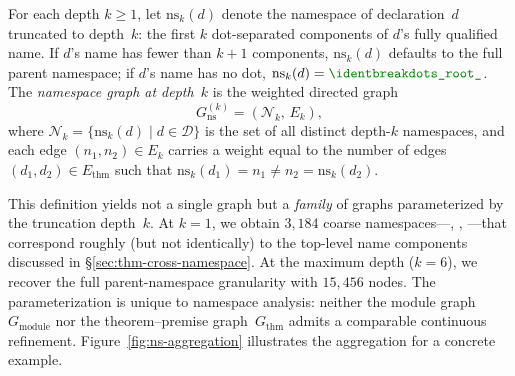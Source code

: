 \begin{definition}
\label{def:ns-graph}
For each depth $k \ge 1$, let $\mathrm{ns}_k(d)$ denote the namespace of declaration~$d$ truncated to depth~$k$: the first $k$ dot-separated components of $d$'s fully qualified name. If $d$'s name has fewer than $k+1$ components, $\mathrm{ns}_k(d)$ defaults to the full parent namespace; if $d$'s name has no dot, $\mathrm{ns}_k(d) = \ns{\_root\_}$. The \emph{namespace graph at depth~$k$} is the weighted directed graph
\[
  G_{\mathrm{ns}}^{(k)} = (\mathcal{N}_k,\, E_k),
\]
where $\mathcal{N}_k = \{\mathrm{ns}_k(d) \mid d \in \mathcal{D}\}$ is the set of all distinct depth-$k$ namespaces, and each edge $(n_1, n_2) \in E_k$ carries a weight equal to the number of edges $(d_1, d_2) \in E_{\mathrm{thm}}$ such that $\mathrm{ns}_k(d_1) = n_1 \neq n_2 = \mathrm{ns}_k(d_2)$.
\end{definition}

This definition yields not a single graph but a \emph{family} of graphs parameterized by the truncation depth~$k$. At $k = 1$, we obtain $3{,}184$ coarse namespaces---, , ---that correspond roughly (but not identically) to the top-level name components discussed in \S\ref{sec:thm-cross-namespace}. At the maximum depth ($k = 6$), we recover the full parent-namespace granularity with $15{,}456$ nodes. The parameterization is unique to namespace analysis: neither the module graph~$G_{\mathrm{module}}$ nor the theorem--premise graph~$G_{\mathrm{thm}}$ admits a comparable continuous refinement. Figure~\ref{fig:ns-aggregation} illustrates the aggregation for a concrete example.

